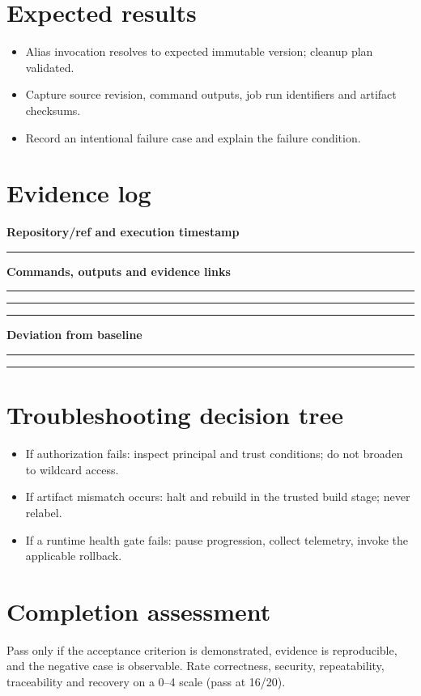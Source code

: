 \documentclass[10pt,letterpaper]{article}
\begin{document}
\section{Expected results}
\begin{itemize}
\item Alias invocation resolves to expected immutable version; cleanup plan validated.
\item Capture source revision, command outputs, job run identifiers and artifact checksums.
\item Record an intentional failure case and explain the failure condition.
\end{itemize}

\section{Evidence log}
\textbf{Repository/ref and execution timestamp}\par
\noindent\rule{\linewidth}{0.35pt}\par\vspace{0.7em}
\textbf{Commands, outputs and evidence links}\par
\noindent\rule{\linewidth}{0.35pt}\par\vspace{0.7em}
\noindent\rule{\linewidth}{0.35pt}\par\vspace{0.7em}
\noindent\rule{\linewidth}{0.35pt}\par\vspace{0.7em}
\textbf{Deviation from baseline}\par
\noindent\rule{\linewidth}{0.35pt}\par\vspace{0.7em}
\noindent\rule{\linewidth}{0.35pt}\par\vspace{0.7em}

\section{Troubleshooting decision tree}
\begin{itemize}
\item If authorization fails: inspect principal and trust conditions; do not broaden to wildcard access.
\item If artifact mismatch occurs: halt and rebuild in the trusted build stage; never relabel.
\item If a runtime health gate fails: pause progression, collect telemetry, invoke the applicable rollback.
\end{itemize}

\section{Completion assessment}
Pass only if the acceptance criterion is demonstrated, evidence is reproducible, and the negative case is observable. Rate correctness, security, repeatability, traceability and recovery on a 0--4 scale (pass at 16/20).
\end{document}
